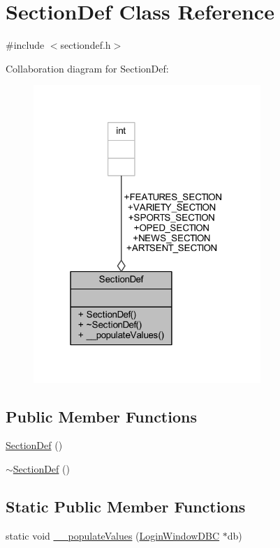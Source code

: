 \hypertarget{class_section_def}{}\section{Section\+Def Class Reference}
\label{class_section_def}


{\ttfamily \#include $<$sectiondef.\+h$>$}



Collaboration diagram for Section\+Def\+:
\nopagebreak
\begin{figure}[H]
\begin{center}
\leavevmode
\includegraphics[width=244pt]{class_section_def__coll__graph}
\end{center}
\end{figure}
\subsection*{Public Member Functions}
\begin{DoxyCompactItemize}
\item 
\hyperlink{class_section_def_ab00c92c7337eabfd419f3a48465d5029}{Section\+Def} ()
\item 
\hyperlink{class_section_def_aee96bf0e2ae86b5fcef8849515e5619e}{$\sim$\+Section\+Def} ()
\end{DoxyCompactItemize}
\subsection*{Static Public Member Functions}
\begin{DoxyCompactItemize}
\item 
static void \hyperlink{class_section_def_a15e74ac63ce2efca15fd0f2bb7832341}{\+\_\+\+\_\+populate\+Values} (\hyperlink{class_login_window_d_b_c}{Login\+Window\+D\+B\+C} $\ast$db)
\end{DoxyCompactItemize}
